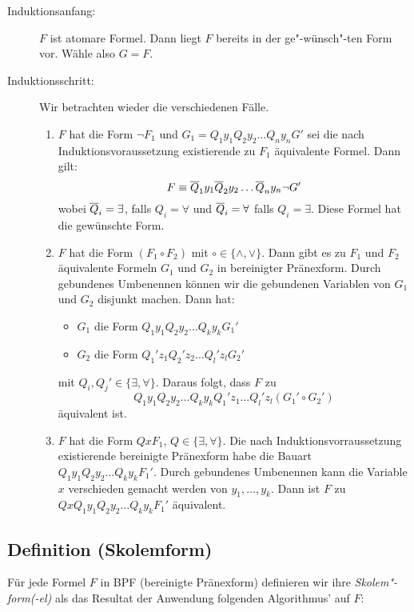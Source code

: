 \documentclass[a4paper]{scrartcl}
\begin{document}
\begin{description}
\item[Induktionsanfang:] $F$ ist atomare Formel. Dann liegt $F$ bereits in der ge"-wünsch"-ten Form vor. Wähle also $G=F$.
\item[Induktionsschritt:] Wir betrachten wieder die verschiedenen Fälle.
	\begin{enumerate}
		\item $F$ hat die Form $\neg F_1$ und $G_1=Q_1y_1Q_2y_2\ldots Q_ny_nG'$ sei die nach Induktionsvoraussetzung existierende
					zu $F_1$ äquivalente Formel. Dann gilt:
					$$F\equiv \overline{Q}_1 y_1 \overline{Q}_2 y_2 \ldots \overline{Q}_n y_n \neg G'$$
					wobei $\overline{Q}_i=\exists$, falls $Q_i=\forall$ und $\overline{Q}_i=\forall$ falls $Q_i=\exists$. Diese Formel hat die gewünschte Form.
		\item $F$ hat die Form $(F_1 \circ F_2)$ mit $\circ\in\{\wedge,\vee\}$. Dann gibt es zu $F_1$ und $F_2$ äquivalente Formeln 
					$G_1$ und $G_2$ in 	bereinigter Pränexform. Durch gebundenes Umbenennen können wir die gebundenen Variablen von $G_1$ 
					und $G_2$ disjunkt machen. Dann hat:
					\begin{itemize}
						\item $G_1$ die Form $Q_1y_1Q_2y_2\ldots Q_ky_kG_1'$
						\item $G_2$ die Form $Q_1'z_1Q_2'z_2\ldots Q_l'z_lG_2'$
					\end{itemize}
					mit $Q_i,Q_j'\in\{\exists,\forall\}$. Daraus folgt, dass $F$ zu 
						$$Q_1y_1Q_2y_2\ldots Q_ky_kQ_1'z_1\ldots Q_l'z_l(G_1'\circ G_2')$$
					äquivalent ist.
		\item $F$ hat die Form $QxF_1$, $Q\in\{\exists,\forall\}$. Die nach Induktionsvorraussetzung existierende bereinigte Pränexform habe die
					Bauart $Q_1y_1Q_2y_2\ldots Q_ky_kF_1'$. Durch gebundenes Umbenennen kann die Variable $x$ verschieden gemacht werden von 
					$y_1,\ldots ,y_k$. Dann ist $F$ zu $QxQ_1y_1Q_2y_2\ldots Q_ky_kF_1'$ äquivalent.
	\end{enumerate}
\end{description}

\subsection{Definition (Skolemform)}

Für jede Formel $F$ in BPF (bereinigte Pränexform) definieren wir ihre \emph{Skolem"-form(-el)} als das Resultat der Anwendung folgenden Algorithmus' auf $F$: 
 
\end{document}

